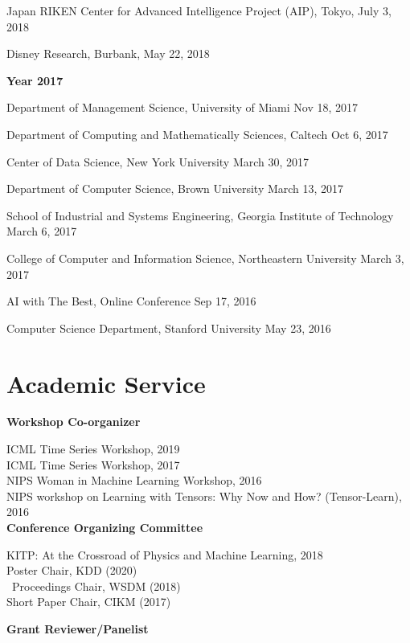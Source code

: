 \documentclass[margin,line]{res}
\begin{document}
\begin{resume}
Japan RIKEN  Center for Advanced Intelligence Project (AIP), Tokyo, \hfill {July 3, 2018}

Disney Research, Burbank, \hfill {May 22, 2018}

 {\bf Year  2017}
 
Department of Management Science,  University of Miami  \hfill {Nov 18, 2017}


Department of Computing and Mathematically Sciences,  Caltech  \hfill {Oct 6, 2017}


Center of Data Science, New York University  \hfill {March 30, 2017}


Department of Computer Science, Brown University   \hfill {March 13, 2017}



School of Industrial and Systems Engineering, Georgia Institute of Technology  \hfill {March 6, 2017}


College of Computer and Information Science, Northeastern University  \hfill {March 3, 2017}


 
 AI with The Best, Online Conference \hfill {Sep 17, 2016}
 
 
Computer Science Department,  Stanford University  \hfill {May 23, 2016}
 
 


\section{\sc Academic Service}
{\bf Workshop Co-organizer}

ICML Time Series  Workshop, 2019 \\
ICML Time Series  Workshop, 2017 \\
NIPS Woman in Machine Learning Workshop, 2016 \\
NIPS workshop on Learning with Tensors: Why Now and How? (Tensor-Learn), 2016 \\



{\bf Conference Organizing Committee}

KITP: At the Crossroad of Physics and Machine Learning,  2018\\
Poster Chair, KDD (2020) \\\
Proceedings Chair, WSDM (2018)\\
Short Paper Chair, CIKM (2017)

{\bf Grant Reviewer/Panelist}


\end{resume}
\end{document}
